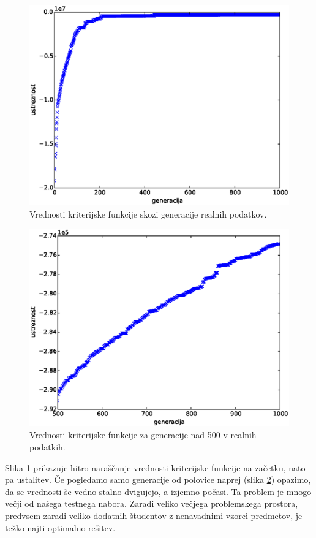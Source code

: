 \documentclass[a4paper,12pt]{book}
\begin{document}
\begin{figure}
	\centering
	\includegraphics[scale=0.5]{res/generation-fitness-REAL.eps}
	\caption{Vrednosti kriterijske funkcije skozi generacije realnih podatkov. }
	\label{pic:generation-fitness-REAL}
\end{figure}

\begin{figure}
	\centering
	\includegraphics[scale=0.5]{res/generation-fitness-REAL-500up.eps}
	\caption{Vrednosti kriterijske funkcije za generacije nad 500 v realnih podatkih. }
	\label{pic:generation-fitness-REAL-500up}
\end{figure}

Slika \ref{pic:generation-fitness-REAL} prikazuje hitro naraščanje vrednosti kriterijske funkcije na začet\-ku, nato pa ustalitev. Če pogledamo samo generacije od polovice naprej (slika \ref{pic:generation-fitness-REAL-500up}) opazimo, da se vrednosti še vedno stalno dvigujejo, a izjemno počasi. Ta problem je mnogo večji od našega testnega nabora. Zaradi veliko večjega problemskega prostora, predvsem zaradi veliko dodatnih študentov z nenavadnimi vzorci predmetov, je težko najti optimalno rešitev. 
\end{document}
